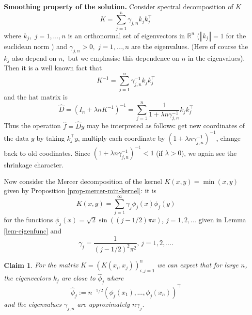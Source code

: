 \documentclass[11pt,twoside]{article}%
\theoremstyle{change}
\newtheorem{claim}[theorem]{Claim}
\begin{document}
\textbf{Smoothing property of the solution.} Consider spectral decomposition
of $K$
\[
K=\sum_{j=1}^{n}\gamma_{j,n}k_{j}k_{j}^{\top}%
\]
where $k_{j},$ $j=1,\ldots,n$ is an orthonormal set of eigenvectors in
$\mathbb{R}^{n}$ ($\left\Vert k_{j}\right\Vert =1$ for the euclidean norm )
and $\gamma_{j,n}>0,$ $j=1,\ldots,n$ are the eigenvalues. (Here of course the
$k_{j}$ also depend on $n,$ but we emphasise this dependence on $n$ in the
eigenvalues). Then it is a well known fact that
\[
K^{-1}=\sum_{j=1}^{n}\gamma_{j,n}^{-1}k_{j}k_{j}^{\top}%
\]
and the hat matrix is
\[
\hat{D}=\left(  I_{n}+\lambda nK^{-1}\right)  ^{-1}=\sum_{j=1}^{n}\frac
{1}{1+\lambda n\gamma_{j,n}^{-1}}k_{j}k_{j}^{\top}%
\]
Thus the operation $\hat{f}=\hat{D}y$ may be interpreted as follows: get new
coordinates of the data $y$ by taking $k_{j}^{\top}y$, multiply each
coordinate by $\left(  1+\lambda n\gamma_{j,n}^{-1}\right)  ^{-1}$, change
back to old coodinates. Since $\left(  1+\lambda n\gamma_{j,n}^{-1}\right)
^{-1}<1$ (if $\lambda>0$), we again see the shrinkage character.

Now consider the Mercer decomposition of the kernel $K\left(  x,y\right)
=\min(x,y)$ given by Proposition \ref{prop-mercer-min-kernel}: it is
\[
K(x,y)=\sum_{j=1}^{\infty}\gamma_{j}\phi_{j}(x)\phi_{j}(y)
\]
for the functions $\phi_{j}(x)=\sqrt{2}\sin\left(  \left(  j-1/2\right)  \pi
x\right)  $, $j=1,2,\ldots$ given in Lemma \ref{lem-eigenfunc} and
\[
\gamma_{j}=\frac{1}{\left(  j-1/2\right)  ^{2}\pi^{2}}\text{, }j=1,2,\ldots.
\]


\begin{claim}
For the matrix $K=\left(  K\left(  x_{i},x_{j}\right)  \right)  _{i,j=1}^{n}$
we can expect that for large $n$, the eigenvectors $k_{j}$ are close to
$\hat{\phi}_{j}$ where
\[
\hat{\phi}_{j}:=n^{-1/2}\left(  \phi_{j}\left(  x_{1}\right)  ,\ldots,\phi
_{j}\left(  x_{n}\right)  \right)  ^{\top}%
\]
and the eigenvalues $\gamma_{j,n}$ are approximately $n\gamma_{j}$.
\end{claim}
\end{document}

